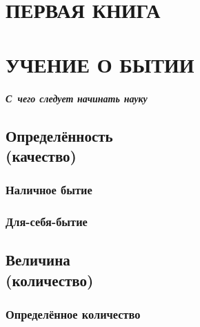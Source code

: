 \documentclass[a5paper, 11pt, twoside, onecolumn, openany]{memoir}
\begin{document}

\part[\hspace{42mm}УЧЕНИЕ О БЫТИИ]%
     {\ \\\vspace{200pt}\Large\mdseries ПЕРВАЯ КНИГА\\\ \\
      \LARGE\bfseries УЧЕНИЕ О БЫТИИ}
\addtocspace{2mm}

\subsubsection{С~чего следует начинать науку}


\chapter[Определённость (качество)]{Определённость\\(качество)}



\section{Наличное бытие}


\section{Для-себя-бытие}


\chapter[Величина (количество)]{Величина\\(количество)}



\section{Определённое количество}

\end{document}
